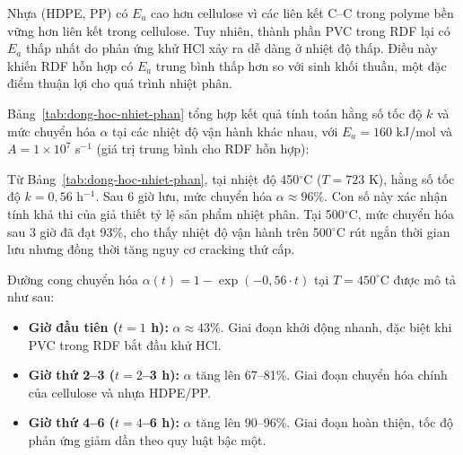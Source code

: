 \documentclass[../main.tex]{subfiles}
\begin{document}
Nhựa (HDPE, PP) có $E_a$ cao hơn cellulose vì các liên kết C--C trong polyme bền vững hơn liên kết trong cellulose. Tuy nhiên, thành phần PVC trong RDF lại có $E_a$ thấp nhất do phản ứng khử HCl xảy ra dễ dàng ở nhiệt độ thấp. Điều này khiến RDF hỗn hợp có $E_a$ trung bình thấp hơn so với sinh khối thuần, một đặc điểm thuận lợi cho quá trình nhiệt phân.

Bảng~\ref{tab:dong-hoc-nhiet-phan} tổng hợp kết quả tính toán hằng số tốc độ $k$ và mức chuyển hóa $\alpha$ tại các nhiệt độ vận hành khác nhau, với $E_a = 160$ kJ/mol và $A = 1 \times 10^7$ s$^{-1}$ (giá trị trung bình cho RDF hỗn hợp):
\begin{table}[htbp]
\centering
\caption{Tổng hợp tính toán động học nhiệt phân RDF tại các nhiệt độ vận hành}
\label{tab:dong-hoc-nhiet-phan}
\setlength{\tabcolsep}{4pt}
\end{table}

Từ Bảng~\ref{tab:dong-hoc-nhiet-phan}, tại nhiệt độ 450$^\circ$C ($T = 723$ K), hằng số tốc độ $k = 0{,}56$ h$^{-1}$. Sau 6 giờ lưu, mức chuyển hóa $\alpha \approx 96\%$. Con số này xác nhận tính khả thi của giả thiết tỷ lệ sản phẩm nhiệt phân. Tại 500$^\circ$C, mức chuyển hóa sau 3 giờ đã đạt 93\%, cho thấy nhiệt độ vận hành trên 500$^\circ$C rút ngắn thời gian lưu nhưng đồng thời tăng nguy cơ cracking thứ cấp.

Đường cong chuyển hóa $\alpha(t) = 1 - \exp(-0{,}56 \cdot t)$ tại $T = 450^\circ$C được mô tả như sau:
\begin{itemize}
  \item \textbf{Giờ đầu tiên ($t = 1$ h):} $\alpha \approx 43\%$. Giai đoạn khởi động nhanh, đặc biệt khi PVC trong RDF bắt đầu khử HCl.
  \item \textbf{Giờ thứ 2--3 ($t = 2$--3 h):} $\alpha$ tăng lên 67--81\%. Giai đoạn chuyển hóa chính của cellulose và nhựa HDPE/PP.
  \item \textbf{Giờ thứ 4--6 ($t = 4$--6 h):} $\alpha$ tăng lên 90--96\%. Giai đoạn hoàn thiện, tốc độ phản ứng giảm dần theo quy luật bậc một.
\end{itemize}
\end{document}
